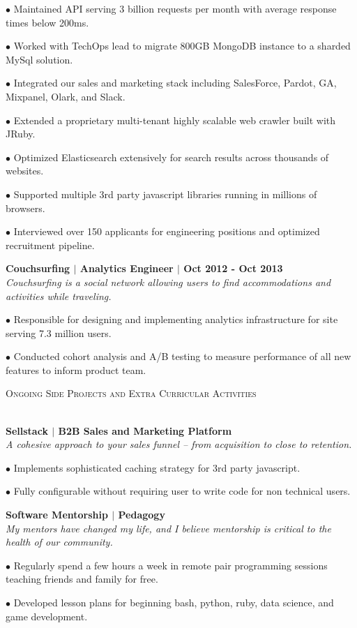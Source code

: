 \documentclass{article}
\newcommand{\lineunder}{\vspace*{-8pt} \\ \hspace*{-18pt} \hrulefill \\}
\newcommand{\header}[1]{{\hspace*{-15pt}\vspace*{6pt} \textsc{#1}} \vspace*{-6pt} \lineunder}
\begin{document}
\begin{description}
	 \item$\bullet$ Maintained API serving 3 billion requests per month with average response times below 200ms.
	 \item$\bullet$ Worked with TechOps lead to migrate 800GB MongoDB instance to a sharded MySql solution.
	 \item$\bullet$ Integrated our sales and marketing stack including SalesForce, Pardot, GA, Mixpanel, Olark, and Slack.
	 \item$\bullet$ Extended a proprietary multi-tenant highly scalable web crawler built with JRuby.
	 \item$\bullet$ Optimized Elasticsearch extensively for search results across thousands of websites.
	 \item$\bullet$ Supported multiple 3rd party javascript libraries running in millions of browsers.
	 \item$\bullet$ Interviewed over 150 applicants for engineering positions and optimized recruitment pipeline. 
	
	 \item \textbf{Couchsurfing $|$ Analytics Engineer $|$ Oct 2012 - Oct 2013} \\
	  \textit{Couchsurfing is a social network allowing users to find accommodations and activities while traveling.}
	 \item$\bullet$ Responsible for designing and implementing analytics infrastructure for site serving 7.3 million users.
	 \item$\bullet$ Conducted cohort analysis and A/B testing to measure performance of all new features to inform product team.
	 
	 
	\end{description}

\header{Ongoing Side Projects and Extra Curricular Activities}

\begin{description}

 \item \textbf{Sellstack $|$ B2B Sales and Marketing Platform } \\
 \textit{A cohesive approach to your sales funnel -- from acquisition to close to retention.}
 \item$\bullet$ Implements sophisticated caching strategy for 3rd party javascript.   
 \item$\bullet$ Fully configurable without requiring user to write code for non technical users.


 \item \textbf{Software Mentorship $|$ Pedagogy } \\
 \textit{My mentors have changed my life, and I believe mentorship is critical to the health of our community. }  
 \item$\bullet$ Regularly spend a few hours a week in remote pair programming sessions teaching friends and family for free.
 \item$\bullet$ Developed lesson plans for beginning bash, python, ruby, data science, and game development.
 

 
\end{description}
\end{document}
